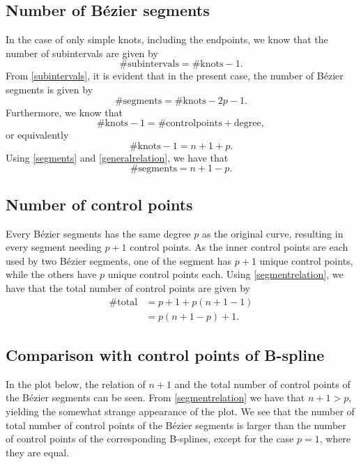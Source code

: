 \documentclass[]{article}
\begin{document}
\subsection*{Number of B\'{e}zier segments}
In the case of only simple knots, including the endpoints, we know that the number of subintervals are given by \begin{equation}\label{subintervals}
\#\mathrm{subintervals} = \#\mathrm{knots} - 1.
\end{equation}
From \eqref{subintervals}, it is evident that in the present case, the number of B\'{e}zier segments is given by \begin{equation}\label{segments}
\#\mathrm{segments} = \#\mathrm{knots} - 2p - 1.
\end{equation}
Furthermore, we know that \begin{equation*}
\#\mathrm{knots} - 1 = \#\mathrm{controlpoints} + \mathrm{degree},
\end{equation*} 
or equivalently\begin{equation}\label{generalrelation}
\#\mathrm{knots} - 1 = n + 1 + p.
\end{equation}
Using \eqref{segments} and \eqref{generalrelation}, we have that \begin{equation}\label{segmentrelation}
\#\mathrm{segments} = n + 1 - p.
\end{equation}
\subsection*{Number of control points}
Every B\'{e}zier segments has the same degree $p$ as the original curve, resulting in every segment needing $p+1$ control points. As the inner control points are each used by two B\'{e}zier segments, one of the segment has $p+1$ unique control points, while the others have $p$ unique control points each. Using \eqref{segmentrelation}, we have that the total number of control points are given by\begin{equation*}
\begin{aligned}
\#\mathrm{total} &= p + 1 + p(n + 1 - 1)\\
&= p(n + 1 - p) + 1.
\end{aligned}
\end{equation*}
\subsection*{Comparison with control points of B-spline}
In the plot below, the relation of $n+1$ and the total number of control points of the B\'{e}zier segments can be seen. From \eqref{segmentrelation} we have that $n+1>p$, yielding the somewhat strange appearance of the plot. We see that the number of total number of control points of the B\'{e}zier segments is larger than the number of control points of the corresponding B-splines, except for the case $p=1$, where they are equal.
\end{document}
